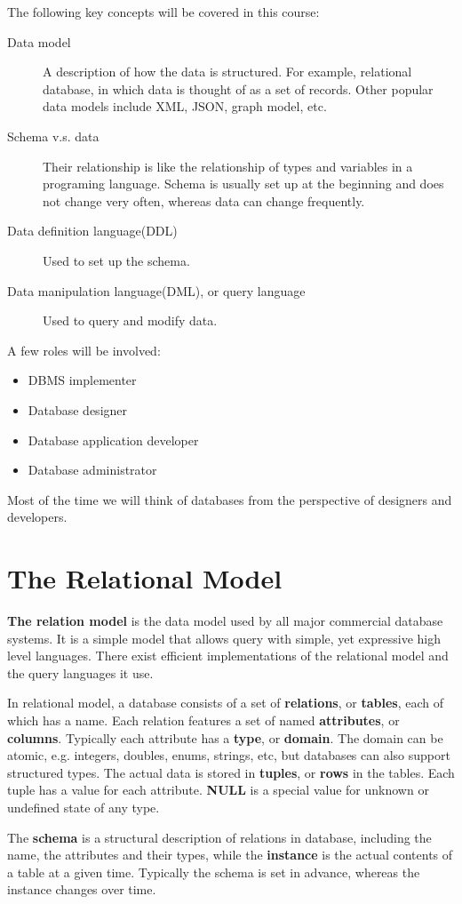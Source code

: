 The following key concepts will be covered in this course:
\begin{description}
\item[Data model]A description of how the data is structured. For example, relational database, in which data is thought of as a set of records. Other popular data models include XML, JSON, graph model, etc.
\item[Schema v.s. data]Their relationship is like the relationship of types and variables in a programing language. Schema is usually set up at the beginning and does not change very often, whereas data can change frequently.
\item[Data definition language(DDL)]Used to set up the schema.
\item[Data manipulation language(DML), or query language]Used to query and modify data.
\end{description}
A few roles will be involved:
\begin{itemize}
\item DBMS implementer
\item Database designer
\item Database application developer
\item Database administrator
\end{itemize}
Most of the time we will think of databases from the perspective of designers and developers.
\section{The Relational Model}
\textbf{The relation model} is the data model used by all major commercial database systems. It is a simple model that allows query with simple, yet expressive high level languages. There exist efficient implementations of the relational model and the query languages it use. 

In relational model, a database consists of a set of \textbf{relations}, or \textbf{tables}, each of which has a name. Each relation features a set of named \textbf{attributes}, or \textbf{columns}. Typically each attribute has a \textbf{type}, or \textbf{domain}. The domain can be atomic, e.g. integers, doubles, enums, strings, etc, but databases can also support structured types. The actual data is stored in \textbf{tuples}, or \textbf{rows} in the tables. Each tuple has a value for each attribute. \textbf{NULL} is a special value for unknown or undefined state of any type.

The \textbf{schema} is a structural description of relations in database, including the name, the attributes and their types, while the \textbf{instance} is the actual contents of a table at a given time. Typically the schema is set in advance, whereas the instance changes over time. 

